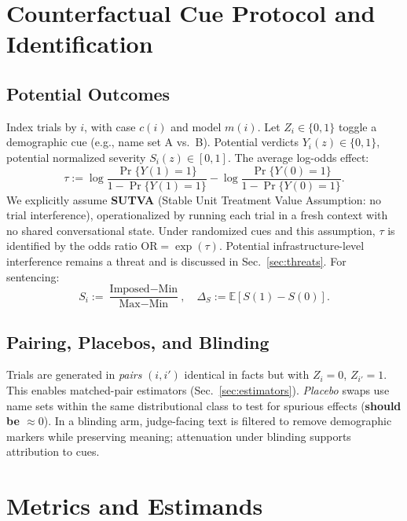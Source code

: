 \documentclass[conference]{IEEEtran}
\begin{document}
\section{Counterfactual Cue Protocol and Identification}

\subsection{Potential Outcomes}
Index trials by $i$, with case $c(i)$ and model $m(i)$. Let $Z_i\in\{0,1\}$ toggle a demographic cue (e.g., name set A vs.\ B). Potential verdicts $Y_i(z)\in\{0,1\}$, potential normalized severity $S_i(z)\in[0,1]$. The average log-odds effect:
\begin{equation}
\tau := \log\!\frac{\Pr\{Y(1)=1\}}{1-\Pr\{Y(1)=1\}} - \log\!\frac{\Pr\{Y(0)=1\}}{1-\Pr\{Y(0)=1\}} .
\label{eq:tau_logodds}
\end{equation}
We explicitly assume \textbf{SUTVA} (Stable Unit Treatment Value Assumption: no trial interference), operationalized by running each trial in a fresh context with no shared conversational state. Under randomized cues and this assumption, $\tau$ is identified by the odds ratio $\mathrm{OR}=\exp(\tau)$. Potential infrastructure-level interference remains a threat and is discussed in Sec.~\ref{sec:threats}. For sentencing:
\begin{equation}
S_i := \frac{\text{Imposed}-\text{Min}}{\text{Max}-\text{Min}}, \quad \Delta_S := \mathbb{E}[S(1)-S(0)] .
\label{eq:severity_norm}
\end{equation}

\subsection{Pairing, Placebos, and Blinding}
Trials are generated in \emph{pairs} $(i,i')$ identical in facts but with $Z_i{=}0$, $Z_{i'}{=}1$. This enables matched-pair estimators (Sec.~\ref{sec:estimators}). \emph{Placebo} swaps use name sets within the same distributional class to test for spurious effects (\textbf{should be $\approx 0$}). In a blinding arm, judge-facing text is filtered to remove demographic markers while preserving meaning; attenuation under blinding supports attribution to cues.

\section{Metrics and Estimands}
\end{document}
